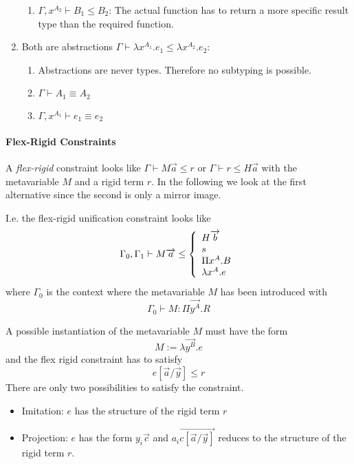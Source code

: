 \begin{enumerate}
\begin{enumerate}
            \item $\Gamma, x^{A_2} \vdash B_1 \le B_2$: The actual function has
                to return a more specific result type than the required
                function.
        \end{enumerate}

    \item Both are abstractions
        $ \Gamma \vdash \lambda x^{A_1}. e_1
                        \le
                        \lambda x^{A_2}. e_2$:

        \begin{enumerate}
            \item Abstractions are never types. Therefore no subtyping is
                possible.

            \item $\Gamma \vdash A_1 \equiv A_2$

            \item $\Gamma, x^{A_1} \vdash e_1 \equiv e_2$
        \end{enumerate}
\end{enumerate}







\paragraph{Flex-Rigid Constraints}

A \emph{flex-rigid} constraint looks like $\Gamma \vdash M \vec a \le r$ or
$\Gamma \vdash r \le  H \vec a$ with the metavariable $M$ and a rigid term $r$.
In the following we look at the first alternative since the second is only a
mirror image.

I.e. the flex-rigid unification constraint looks like
$$
%
    \Gamma_0, \Gamma_1
%
    \vdash
%
    M \vec a
%
    \le
%
    \cases {
        H \vec b
        \\
        s
        \\
        \Pi x^A. B
        \\
        \lambda x^A. e
    }
$$
%
where $\Gamma_0$ is the context where the metavariable $M$ has been
introduced with
$$
    \Gamma_0 \vdash M : \Pi \vec {y^A}. R
$$

A possible instantiation of the metavariable $M$ must have the form
$$
    M := \lambda \vec{y^B}. e
$$
and the flex rigid constraint has to satisfy
$$
    e[\vec a / \vec y] \le r
$$
There are only two possibilities to satisfy the constraint.
\begin{itemize}
    \item Imitation: $e$ has the structure of the rigid term $r$

    \item Projection: $e$ has the form $y_i \vec c$ and $a_i \vec{c[\vec a/\vec
        y]}$ reduces to the structure of the rigid term $r$.
\end{itemize}





